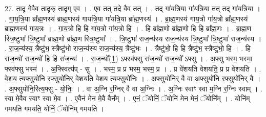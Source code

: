 \documentclass[17pt]{extarticle}
\begin{document}
27. ता॒दृ गे॒वैव ता॒दृक् ता॒दृग् ए॒व । . ए॒व तत् तदे॒ वैव तत् । . तद् गा॑यत्रि॒या गा॑यत्रि॒या तत् तद् गा॑यत्रि॒या । . गा॒य॒त्रि॒या ब्रा᳚ह्म॒णस्य॑ ब्राह्म॒णस्य॑ गायत्रि॒या गा॑यत्रि॒या ब्रा᳚ह्म॒णस्य॑ । . ब्रा॒ह्म॒णस्य॑ गाय॒त्रो गा॑य॒त्रो ब्रा᳚ह्म॒णस्य॑ ब्राह्म॒णस्य॑ गाय॒त्रः । . गा॒य॒त्रो हि हि गा॑य॒त्रो गा॑य॒त्रो हि । . हि ब्रा᳚ह्म॒णो ब्रा᳚ह्म॒णो हि हि ब्रा᳚ह्म॒णः । . ब्रा॒ह्म॒ण स्त्रि॒ष्टुभा᳚ त्रि॒ष्टुभा᳚ ब्राह्म॒णो ब्रा᳚ह्म॒ण स्त्रि॒ष्टुभा᳚ । . त्रि॒ष्टुभा॑ राज॒न्य॑स्य राज॒न्य॑स्य त्रि॒ष्टुभा᳚ त्रि॒ष्टुभा॑ राज॒न्य॑स्य । . रा॒ज॒न्य॑स्य॒ त्रैष्टु॑भ॒ स्त्रैष्टु॑भो राज॒न्य॑स्य राज॒न्य॑स्य॒ त्रैष्टु॑भः । . त्रैष्टु॑भो॒ हि हि त्रैष्टु॑भ॒ स्त्रैष्टु॑भो॒ हि । . हि रा॑ज॒न्यो॑ राज॒न्यो॑ हि हि रा॑ज॒न्यः॑ । . रा॒ज॒न्यो᳚(1॒) ऽफ्स्व॑फ्सु रा॑ज॒न्यो॑ राज॒न्यो᳚ ऽफ्सु । . अ॒फ्सु भस्म॒ भस्मा॒ फ्स्व॑फ्सु भस्म॑ । . अ॒फ्स्वित्य॑प् - सु । . भस्म॒ प्र प्र भस्म॒ भस्म॒ प्र । . प्र वे॑शयति वेशयति॒ प्र प्र वे॑शयति । . वे॒श॒य॒ त्य॒फ्सुयो॑नि र॒फ्सुयो॑निर् वेशयति वेशय त्य॒फ्सुयो॑निः । . अ॒फ्सुयो॑नि॒र् वै वा अ॒फ्सुयो॑नि र॒फ्सुयो॑नि॒र् वै । . अ॒फ्सुयो॑नि॒रित्य॒फ्सु - यो॒निः॒ । . वा अ॒ग्नि र॒ग्निर् वै वा अ॒ग्निः । . अ॒ग्निः स्वाꣳ स्वा म॒ग्नि र॒ग्निः स्वाम् । . स्वा मे॒वैव स्वाꣳ स्वा मे॒व । . ए॒वैन॑ मेन मे॒वै वैन᳚म् । . ए॒नं॒ ॅयोनिं॒ ॅयोनि॑ मेन मेनं॒ ॅयोनि᳚म् । . योनि॑म् गमयति गमयति॒ योनिं॒ ॅयोनि॑म् गमयति । \newline
\end{document}
